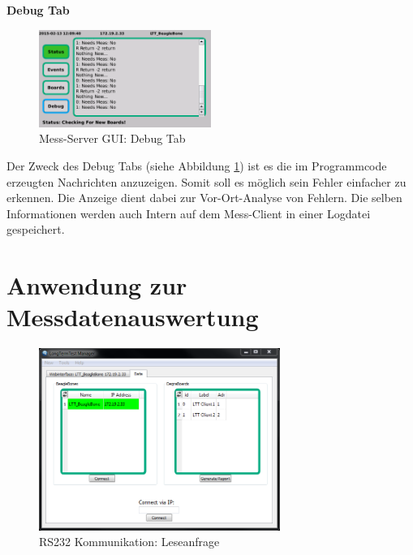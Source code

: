 \textbf{Debug Tab}

\begin{figure}[H]
\begin{center}
\includegraphics[width=0.5\textwidth ]{img/GUI/Server_GUI_Debug2.png}
\caption{Mess-Server GUI: Debug Tab}
\label{figure_MessServerGUIDebug}
\end{center}
\end{figure}

Der Zweck des Debug Tabs (siehe Abbildung \ref{figure_MessServerGUIDebug}) ist es die im Programmcode erzeugten Nachrichten anzuzeigen. Somit soll es möglich sein Fehler einfacher zu erkennen. Die Anzeige dient dabei zur Vor-Ort-Analyse von Fehlern. Die selben Informationen werden auch Intern auf dem Mess-Client in einer Logdatei gespeichert.



\section{Anwendung zur Messdatenauswertung}

\begin{figure}[H]
\begin{center}
\includegraphics[width=0.7\textwidth ]{img/general/PCClientMain.PNG}
\caption{RS232 Kommunikation: Leseanfrage}
\label{figure_RS232Kommunikation}
\end{center}
\end{figure}


